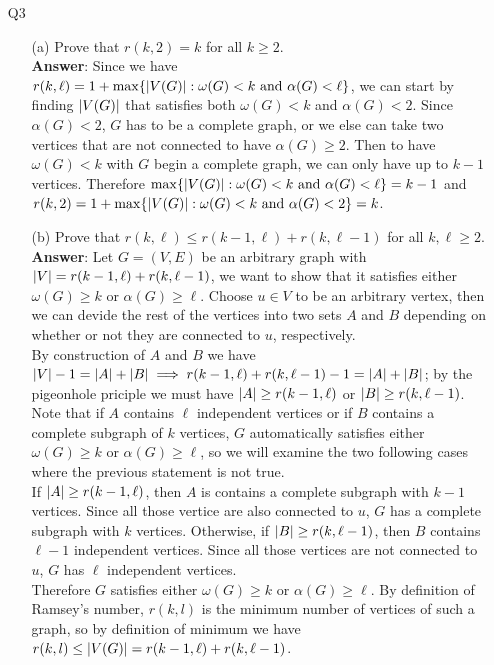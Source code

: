 \documentclass{article}
\begin{document}
\newpage
\begin{itemize}
      \item [Q3]
            \begin{itemize}
                  \item [(a)] Prove that $r(k,2)=k$ for all $k\geq 2$.\\
                        \textbf{Answer}: Since we have $r(k,\ell)=1+\max\{\abs{V(G)}:\omega(G)<k\text{ and }\alpha(G)<\ell\}$, we can start by finding $\abs{V(G)}$ that satisfies both $\omega(G)<k$ and $\alpha(G)<2$. Since $\alpha(G)<2$, $G$ has to be a complete graph, or we else can take two vertices that are not connected to have $\alpha(G)\geq 2$. Then to have $\omega(G)<k$ with $G$ begin a complete graph, we can only have up to $k-1$ vertices. Therefore $\max\{\abs{V(G)}:\omega(G)<k\text{ and }\alpha(G)<\ell\}=k-1$ and $r(k,2)=1+\max\{\abs{V(G)}:\omega(G)<k\text{ and }\alpha(G)<2\}=k$.
                  \item [(b)] Prove that $r(k,\ell)\leq r(k-1,\ell)+r(k,\ell-1)$ for all $k,\ell\geq 2$.\\
                        \textbf{Answer}: Let $G=(V,E)$ be an arbitrary graph with $\abs{V}=r(k-1,\ell)+r(k,\ell-1)$, we want to show that it satisfies either $\omega(G)\geq k$ or $\alpha(G)\geq\ell$. Choose $u\in V$ to be an arbitrary vertex, then we can devide the rest of the vertices into two sets $A$ and $B$ depending on whether or not they are connected to $u$, respectively.\\
                        By construction of $A$ and $B$ we have $\abs{V}-1=\abs{A}+\abs{B}\implies r(k-1,\ell)+r(k,\ell-1)-1=\abs{A}+\abs{B}$; by the pigeonhole priciple we must have $\abs{A}\geq r(k-1,\ell)$ or $\abs{B}\geq r(k,\ell-1)$. Note that if $A$ contains $\ell$ independent vertices or if $B$ contains a complete subgraph of $k$ vertices, $G$ automatically satisfies either $\omega(G)\geq k$ or $\alpha(G)\geq\ell$, so we will examine the two following cases where the previous statement is not true.\\
                        If $\abs{A}\geq r(k-1,\ell)$, then $A$ is contains a complete subgraph with $k-1$ vertices. Since all those vertice are also connected to $u$, $G$ has a complete subgraph with $k$ vertices. Otherwise, if $\abs{B}\geq r(k,\ell-1)$, then $B$ contains $\ell-1$ independent vertices. Since all those vertices are not connected to $u$, $G$ has $\ell$ independent vertices.\\
                        Therefore $G$ satisfies either $\omega(G)\geq k$ or $\alpha(G)\geq\ell$. By definition of Ramsey's number, $r(k,l)$ is the minimum number of vertices of such a graph, so by definition of minimum we have $r(k,l)\leq\abs{V(G)}=r(k-1,\ell)+r(k,\ell-1)$.

\end{itemize}
\end{itemize}
\end{document}
